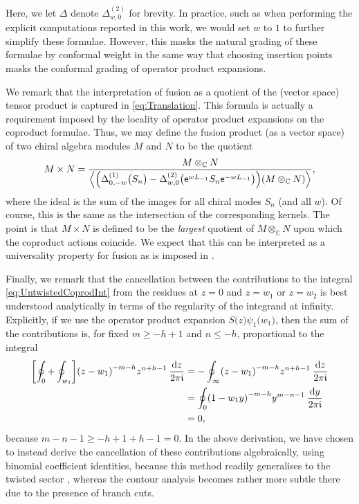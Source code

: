 \documentclass[a4paper,reqno,12pt]{report}
\theoremstyle{definition}
\numberwithin{equation}{section}
\let\originalleft\left     %
\let\originalright\right
\renewcommand{\left}{\mathopen{}\mathclose\bgroup\originalleft}
\renewcommand{\right}{\aftergroup\egroup\originalright}
\newcommand{\tfunc}[2]{#1 \bigl( #2 \bigr)} %
\newcommand{\brac}[1]{\left( #1 \right)}
\newcommand{\sqbrac}[1]{\left[ #1 \right]}
\newcommand{\CC}{\mathbb{C}}
\newcommand{\dd}{\mathrm{d}}   %
\newcommand{\ii}{\mathfrak{i}} %
\newcommand{\ee}{\mathsf{e}}   %
\newcommand{\fuse}{\mathbin{\times}}                                            %
\newcommand{\coproductsymb}{\Delta}                                                %
\newcommand{\Ncoproductsymb}[1]{\coproductsymb^{(#1)}}                             %
\newcommand{\parNcoproductsymb}[2]{\Ncoproductsymb{#1}_{#2}}                       %
\newcommand{\parNcoproduct}[3]{\Ncoproductsymb{#1}_{#2} \bigl( #3 \bigr)}          %
\newcommand{\ope}{operator product expansion}
\newcommand{\opes}{operator product expansions}
\renewcommand{\ge}{\geqslant}
\renewcommand{\le}{\leqslant}
\theoremstyle{plain}
\begin{document}
Here, we let $\coproductsymb$ denote $\parNcoproductsymb{2}{w,0}$ for brevity.  In practice, such as when performing the explicit computations reported in this work, we would set $w$ to $1$ to further simplify these formulae.  However, this masks the natural grading of these formulae by conformal weight in the same way that choosing insertion points masks the conformal grading of \opes{}.

We remark that the interpretation of fusion as a quotient of the (vector space) tensor product is captured in \cref{eq:Translation}.  This formula is actually a requirement imposed by the locality of \opes{} on the coproduct formulae.  Thus, we may define the fusion product (as a vector space) of two chiral algebra modules $M$ and $N$ to be the quotient
\begin{equation} \label{eq:DefFusion}
M \fuse N = \frac{M \otimes_{\CC} N}{\left\langle \brac{\parNcoproduct{1}{0,-w}{S_n} - \parNcoproduct{2}{w,0}{\ee^{wL_{-1}} S_n \ee^{-wL_{-1}}}} \brac{M \otimes_{\CC} N} \right\rangle},
\end{equation}
where the ideal is the sum of the images for all chiral modes $S_n$ (and all $w$).  Of course, this is the same as the intersection of the corresponding kernels.  The point is that $M \fuse N$ is defined to be the \emph{largest} quotient of $M \otimes_{\CC} N$ upon which the coproduct actions coincide.  We expect that this can be interpreted as a universality property for fusion as is imposed in \cite{HuaLog07}.

Finally, we remark that the cancellation between the contributions to the integral \eqref{eq:UntwistedCoprodInt} from the residues at $z=0$ and $z=w_1$ or $z=w_2$ is best understood analytically in terms of the regularity of the integrand at infinity.  Explicitly, if we use the \ope{} $\tfunc{S}{z} \tfunc{\psi_1}{w_1}$, then the sum of the contributions is, for fixed $m \ge -h+1$ and $n \le -h$, proportional to the integral
\begin{align}
\sqbrac{\oint_0 + \oint_{w_1}} \brac{z-w_1}^{-m-h} z^{n+h-1} \: \frac{\dd z}{2 \pi \ii} &= -\oint_{\infty} \brac{z-w_1}^{-m-h} z^{n+h-1} \: \frac{\dd z}{2 \pi \ii} \notag \\
&= \oint_0 \brac{1 - w_1 y}^{-m-h} y^{m-n-1} \: \frac{\dd y}{2 \pi \ii} \notag \\
&= 0,
\end{align}
because $m-n-1 \ge -h+1 + h - 1 = 0$.  In the above derivation, we have chosen to instead derive the cancellation of these contributions algebraically, using binomial coefficient identities, because this method readily generalises to the twisted sector \cite{CanFusII15}, whereas the contour analysis becomes rather more subtle there due to the presence of branch cuts.
\end{document}
